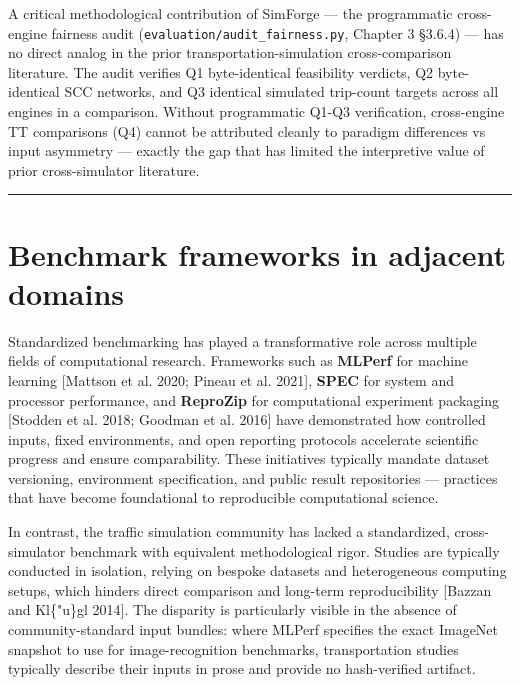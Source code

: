 A critical methodological contribution of SimForge --- the programmatic
cross-engine fairness audit (\texttt{evaluation/audit\_fairness.py},
Chapter 3 §3.6.4) --- has no direct analog in the prior
transportation-simulation cross-comparison literature. The audit
verifies Q1 byte-identical feasibility verdicts, Q2 byte-identical SCC
networks, and Q3 identical simulated trip-count targets across all
engines in a comparison. Without programmatic Q1-Q3 verification,
cross-engine TT comparisons (Q4) cannot be attributed cleanly to
paradigm differences vs input asymmetry --- exactly the gap that has
limited the interpretive value of prior cross-simulator literature.

\begin{center}\rule{0.5\linewidth}{0.5pt}\end{center}

\section{Benchmark frameworks in adjacent
domains}\label{26-benchmark-frameworks-in-adjacent-domains}

Standardized benchmarking has played a transformative role across
multiple fields of computational research. Frameworks such as
\textbf{MLPerf} for machine learning {[}Mattson et al. 2020; Pineau et
al. 2021{]}, \textbf{SPEC} for system and processor performance, and
\textbf{ReproZip} for computational experiment packaging {[}Stodden et
al. 2018; Goodman et al. 2016{]} have demonstrated how controlled
inputs, fixed environments, and open reporting protocols accelerate
scientific progress and ensure comparability. These initiatives
typically mandate dataset versioning, environment specification, and
public result repositories --- practices that have become foundational
to reproducible computational science.

In contrast, the traffic simulation community has lacked a standardized,
cross-simulator benchmark with equivalent methodological rigor. Studies
are typically conducted in isolation, relying on bespoke datasets and
heterogeneous computing setups, which hinders direct comparison and
long-term reproducibility {[}Bazzan and Kl\{"u\}gl 2014{]}. The
disparity is particularly visible in the absence of community-standard
input bundles: where MLPerf specifies the exact ImageNet snapshot to use
for image-recognition benchmarks, transportation studies typically
describe their inputs in prose and provide no hash-verified artifact.

